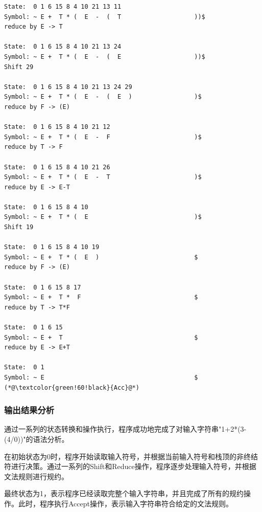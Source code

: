 \documentclass[lang=cn,11pt,a4paper]{elegantpaper}
\begin{document}
\begin{lstlisting}[language=text]
State:  0 1 6 15 8 4 10 21 13 11                  
Symbol: ~ E +  T * (  E  -  (  T                   	))$                           	reduce by E -> T

State:  0 1 6 15 8 4 10 21 13 24                  
Symbol: ~ E +  T * (  E  -  (  E                   	))$                           	Shift 29

State:  0 1 6 15 8 4 10 21 13 24 29               
Symbol: ~ E +  T * (  E  -  (  E  )                	)$                            	reduce by F -> (E)

State:  0 1 6 15 8 4 10 21 12                     
Symbol: ~ E +  T * (  E  -  F                      	)$                            	reduce by T -> F

State:  0 1 6 15 8 4 10 21 26                     
Symbol: ~ E +  T * (  E  -  T                      	)$                            	reduce by E -> E-T

State:  0 1 6 15 8 4 10                           
Symbol: ~ E +  T * (  E                            	)$                            	Shift 19

State:  0 1 6 15 8 4 10 19                        
Symbol: ~ E +  T * (  E  )                         	$                             	reduce by F -> (E)

State:  0 1 6 15 8 17                             
Symbol: ~ E +  T *  F                              	$                             	reduce by T -> T*F

State:  0 1 6 15                                  
Symbol: ~ E +  T                                   	$                             	reduce by E -> E+T

State:  0 1                                       
Symbol: ~ E                                        	$                             	(*@\textcolor{green!60!black}{Acc}@*)
\end{lstlisting}

\subsubsection{输出结果分析}

通过一系列的状态转换和操作执行，程序成功地完成了对输入字符串"1+2*(3-(4/0))"的语法分析。

在初始状态为0时，程序开始读取输入符号，并根据当前输入符号和栈顶的非终结符进行决策。通过一系列的Shift和Reduce操作，程序逐步处理输入符号，并根据文法规则进行规约。

最终状态为1，表示程序已经读取完整个输入字符串，并且完成了所有的规约操作。此时，程序执行Accept操作，表示输入字符串符合给定的文法规则。
\end{document}
